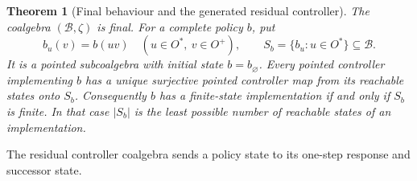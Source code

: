 \documentclass[11pt,a4paper]{article}
\numberwithin{equation}{section}
\newtheorem{theorem}{Theorem}[section]
\theoremstyle{definition}
\theoremstyle{remark}
\theoremstyle{plain}
\begin{document}
\begin{theorem}[Final behaviour and the generated residual controller]
\label{thm:egt-residual-controller}
The coalgebra $(\mathcal B,\zeta)$ is final.
For a complete policy $b$, put
\[
 b_u(v)=b(uv)\quad(u\in O^*,\ v\in O^+),\qquad
 S_b=\{b_u:u\in O^*\}\subseteq\mathcal B.
\]
It is a pointed subcoalgebra with initial state $b=b_{\varnothing}$.
Every pointed controller implementing $b$ has a unique surjective
pointed controller map from its reachable states onto $S_b$.
Consequently $b$ has a finite-state implementation if and only if
$S_b$ is finite. In that case $|S_b|$ is the least possible number
of reachable states of an implementation.
\end{theorem}

\noindent The residual controller coalgebra sends a policy state to its one-step response and successor state.
\begin{center}
\end{center}
\end{document}
